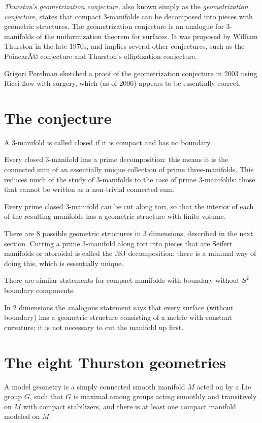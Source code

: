 \documentclass[12pt]{article}
\begin{document}
{\em Thurston's geometrization conjecture}, also known simply as the {\em geometrization conjecture}, states that compact 3-manifolds can be decomposed into pieces with geometric structures. The geometrization conjecture is an analogue for 3-manifolds of the uniformization theorem for surfaces.  It was proposed by William Thurston in the late 1970s, and implies several other conjectures, such as the PoincarÃ© conjecture and Thurston's elliptization conjecture.  

Grigori Perelman sketched a proof of the geometrization conjecture in 2003 using Ricci flow with surgery, which (as of 2006) appears to be essentially correct.

\section{The conjecture}

A 3-manifold is called closed if it is compact and has no boundary.

Every closed 3-manifold has a  prime decomposition: this means it is the connected sum of an essentially unique collection of prime three-manifolds. This reduces much of the study of 3-manifolds to the case of prime 3-manifolds: those that cannot be written as a non-trivial connected sum. 

Every prime closed 3-manifold can be cut along tori, so that the interior of each of the resulting manifolds has a geometric structure with finite volume.

There are 8 possible geometric structures in 3 dimensions, described in the next section.
Cutting a prime 3-manifold along tori into pieces that are Seifert manifolds or atoroidal is called the JSJ decomposition: there is  a  minimal way of doing this, which is essentially unique. 

There are similar statements for compact manifolds with boundary without $S^2$ boundary components. 

In 2 dimensions the analogous statement says that every  surface (without boundary) has a geometric structure consisting of a metric with constant curvature; it is not necessary to cut the manifold up first.

\section{The eight Thurston geometries}

A model geometry is a simply connected smooth manifold $M$ acted on  by a Lie group $G$,  such that $G$ is maximal among groups acting smoothly and transitively on $M$ with compact stabilizers, and there is at least one compact manifold modeled on $M$.    
\end{document}
